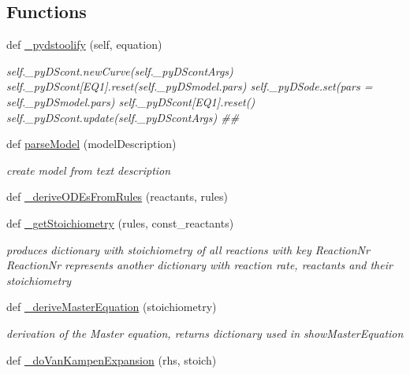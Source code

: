 \subsection*{Functions}
\begin{DoxyCompactItemize}
\item 
def \hyperlink{namespace_mu_mo_t_1_1_mu_mo_t_aa92c55a994d799a87d6bc8e0b08372ba}{\+\_\+pydstoolify} (self, equation)
\begin{DoxyCompactList}\small\item\em self.\+\_\+py\+D\+Scont.\+new\+Curve(self.\+\_\+py\+D\+Scont\+Args) self.\+\_\+py\+D\+Scont\mbox{[}\textquotesingle{}E\+Q1\textquotesingle{}\mbox{]}.reset(self.\+\_\+py\+D\+Smodel.\+pars) self.\+\_\+py\+D\+Sode.\+set(pars = self.\+\_\+py\+D\+Smodel.\+pars) self.\+\_\+py\+D\+Scont\mbox{[}\textquotesingle{}E\+Q1\textquotesingle{}\mbox{]}.reset() self.\+\_\+py\+D\+Scont.\+update(self.\+\_\+py\+D\+Scont\+Args) \#\# \end{DoxyCompactList}\item 
def \hyperlink{namespace_mu_mo_t_1_1_mu_mo_t_a8a03b36c690f28169c5c116d8e06116f}{parse\+Model} (model\+Description)
\begin{DoxyCompactList}\small\item\em create model from text description \end{DoxyCompactList}\item 
def \hyperlink{namespace_mu_mo_t_1_1_mu_mo_t_a139ce7eb800f1bebc88c8da1bea24d4f}{\+\_\+derive\+O\+D\+Es\+From\+Rules} (reactants, rules)
\item 
def \hyperlink{namespace_mu_mo_t_1_1_mu_mo_t_a6efd37b7d1bd1b5487b94a6083fa4eb4}{\+\_\+get\+Stoichiometry} (rules, const\+\_\+reactants)
\begin{DoxyCompactList}\small\item\em produces dictionary with stoichiometry of all reactions with key Reaction\+Nr Reaction\+Nr represents another dictionary with reaction rate, reactants and their stoichiometry \end{DoxyCompactList}\item 
def \hyperlink{namespace_mu_mo_t_1_1_mu_mo_t_a08c33c3f09bc345041d89861f4fb86af}{\+\_\+derive\+Master\+Equation} (stoichiometry)
\begin{DoxyCompactList}\small\item\em derivation of the Master equation, returns dictionary used in show\+Master\+Equation \end{DoxyCompactList}\item 
def \hyperlink{namespace_mu_mo_t_1_1_mu_mo_t_a740f34f3cdcc792a63fb50261b075020}{\+\_\+do\+Van\+Kampen\+Expansion} (rhs, stoich)

\end{DoxyCompactItemize}
